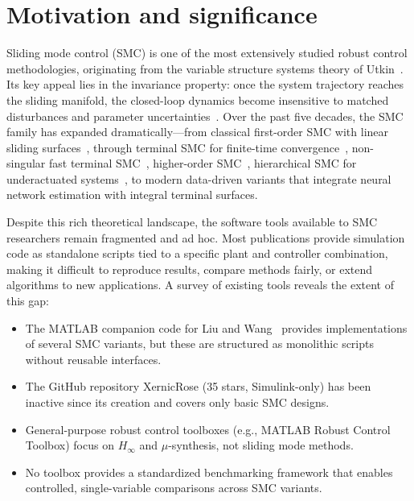\documentclass[preprint,12pt]{elsarticle}
\begin{document}
\section{Motivation and significance}
\label{sec:motivation}

Sliding mode control (SMC) is one of the most extensively studied robust control methodologies, originating from the variable structure systems theory of Utkin~\cite{utkin1977variable}. Its key appeal lies in the invariance property: once the system trajectory reaches the sliding manifold, the closed-loop dynamics become insensitive to matched disturbances and parameter uncertainties~\cite{edwards1998sliding}. Over the past five decades, the SMC family has expanded dramatically---from classical first-order SMC with linear sliding surfaces~\cite{utkin1977variable}, through terminal SMC for finite-time convergence~\cite{yu2009terminal}, non-singular fast terminal SMC~\cite{feng2014non}, higher-order SMC~\cite{levant2003higher}, hierarchical SMC for underactuated systems~\cite{qian2015hierarchical}, to modern data-driven variants that integrate neural network estimation with integral terminal surfaces.

Despite this rich theoretical landscape, the software tools available to SMC researchers remain fragmented and ad hoc. Most publications provide simulation code as standalone scripts tied to a specific plant and controller combination, making it difficult to reproduce results, compare methods fairly, or extend algorithms to new applications. A survey of existing tools reveals the extent of this gap:

\begin{itemize}
    \item The MATLAB companion code for Liu and Wang~\cite{liu2013advanced} provides implementations of several SMC variants, but these are structured as monolithic scripts without reusable interfaces.
    \item The GitHub repository XernicRose (35 stars, Simulink-only) has been inactive since its creation and covers only basic SMC designs.
    \item General-purpose robust control toolboxes (e.g., MATLAB Robust Control Toolbox) focus on $H_\infty$ and $\mu$-synthesis, not sliding mode methods.
    \item No toolbox provides a standardized benchmarking framework that enables controlled, single-variable comparisons across SMC variants.
\end{itemize}
\end{document}
